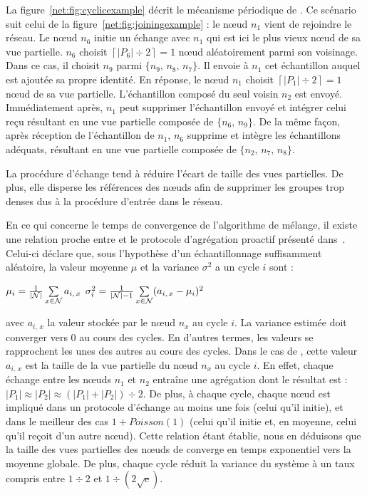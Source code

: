 La figure~\ref{net:fig:cyclicexample} décrit le mécanisme périodique de
\SPRAY. Ce scénario suit celui de la figure~\ref{net:fig:joiningexample} : le
nœud $n_1$ vient de rejoindre le réseau. Le nœud $n_6$ initie un échange avec
$n_1$ qui est ici le plus vieux nœud de sa vue partielle. $n_6$ choisit
$\left\lceil{|P_6|\div 2}\right\rceil = 1$ nœud aléatoirement parmi son
voisinage. Dans ce cas, il choisit $n_9$ parmi $\{n_9,\,n_8,\,n_7\}$. Il envoie
à $n_1$ cet échantillon auquel est ajoutée sa propre identité. En réponse, le
nœud $n_1$ choisit $\left\lceil{|P_1|\div 2}\right\rceil = 1$ nœud de sa vue
partielle. L'échantillon composé du seul voisin $n_2$ est envoyé. Immédiatement
après, $n_1$ peut supprimer l'échantillon envoyé et intégrer celui reçu
résultant en une vue partielle composée de $\{n_6,\, n_9\}$.  De la même façon,
après réception de l'échantillon de $n_1$, $n_6$ supprime et intègre les
échantillons adéquats, résultant en une vue partielle composée de
$\{n_2,\,n_7,\,n_8\}$.

La procédure d'échange tend à réduire l'écart de taille des vues partielles. De
plus, elle disperse les références des nœuds afin de supprimer les groupes trop
denses dus à la procédure d'entrée dans le réseau.

En ce qui concerne le temps de convergence de l'algorithme de mélange, il existe
une relation proche entre \SPRAY et le protocole d'agrégation proactif
présenté dans~\cite{jelasity2004epidemic, montresor2004robust}. Celui-ci déclare
que, sous l'hypothèse d'un échantillonnage suffisamment aléatoire, la valeur
moyenne $\mu$ et la variance $\sigma^2$ a un cycle $i$ sont :
\begin{center}
  $\mu_i = {1\over{|\mathcal{N}|}} \sum\limits_{x \in \mathcal{N}} a_{i,\,x}$
  \hfill
  $\sigma^2_i = {1\over{|\mathcal{N}|-1}}\sum\limits_{x \in \mathcal{N}}
  (a_{i,\,x} - \mu_i)^2$
\end{center}
avec $a_{i,\,x}$ la valeur stockée par le nœud $n_x$ au cycle $i$. La variance
estimée doit converger vers 0 au cours des cycles. En d'autres termes, les
valeurs se rapprochent les unes des autres au cours des cycles. Dans le cas de
\SPRAY, cette valeur $a_{i,\,x}$ est la taille de la vue partielle du nœud $n_x$
au cycle $i$. En effet, chaque échange entre les nœuds $n_1$ et $n_2$ entraîne
une agrégation dont le résultat est :
$|P_1|\approx|P_2|\approx{(|P_1| + |P_2|) \div 2}$.  De plus, à chaque cycle,
chaque nœud est impliqué dans un protocole d'échange au moins une fois (celui
qu'il initie), et dans le meilleur des cas $1+Poisson(1)$ (celui qu'il initie
et, en moyenne, celui qu'il reçoit d'un autre nœud). Cette relation étant
établie, nous en déduisons que la taille des vues partielles des nœuds de \SPRAY
converge en temps exponentiel vers la moyenne globale. De plus, chaque cycle
réduit la variance du système à un taux compris entre ${1\div 2}$ et
$1\div ({2\sqrt{\text{e}}})$.

